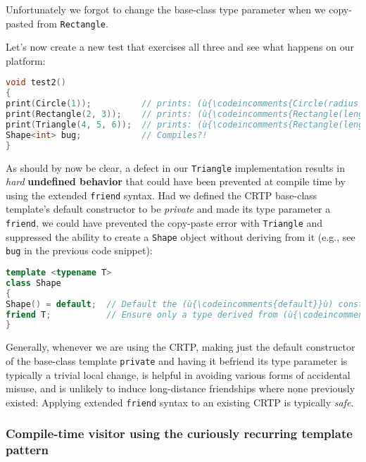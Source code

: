 \noindent Unfortunately we forgot to change the base-class type parameter when we
copy-pasted from \texttt{Rectangle}.

Let's now create a new test that exercises all three and see what
happens on our platform:

\begin{lstlisting}[language=C++]
void test2()
{
print(Circle(1));          // prints: (ù{\codeincomments{Circle(radius = 1)}}ù)
print(Rectangle(2, 3));    // prints: (ù{\codeincomments{Rectangle(length = 2, width = 3)}}ù)
print(Triangle(4, 5, 6));  // prints: (ù{\codeincomments{Rectangle(length = 4, width = 5)}}ù) ?!
Shape<int> bug;            // Compiles?!
}
\end{lstlisting}

\noindent As should by now be clear, a defect in our \texttt{Triangle}
implementation results in \emph{hard} \textbf{undefined behavior} that
could have been prevented at compile time by using the extended
\texttt{friend} syntax. Had we defined the CRTP base-class template's
default constructor to be \emph{private} and made its type parameter a
\texttt{friend}, we could have prevented the copy-paste error with
\texttt{Triangle} and suppressed the ability to create a \texttt{Shape}
object without deriving from it (e.g., see \texttt{bug} in the previous
code snippet):

\begin{lstlisting}[language=C++]
template <typename T>
class Shape
{
Shape() = default;  // Default the (ù{\codeincomments{default}}ù) constructor to be (ù{\codeincomments{private}}ù).
friend T;           // Ensure only a type derived from (ù{\codeincomments{T}}ù) has access.
}
\end{lstlisting}

\noindent Generally, whenever we are using the CRTP, making just the
default constructor of the base-class template \texttt{private} and
having it befriend its type parameter is typically a trivial local
change, is helpful in avoiding various forms of accidental misuse, and
is unlikely to induce long-distance friendships where none previously
existed: Applying extended \texttt{friend} syntax to an existing CRTP
is typically \emph{safe}.

\subsubsection[Compile-time visitor using the curiously recurring template pattern]{Compile-time visitor using the curiously recurring template pattern}\label{compile-time-visitor-using-crtp}

